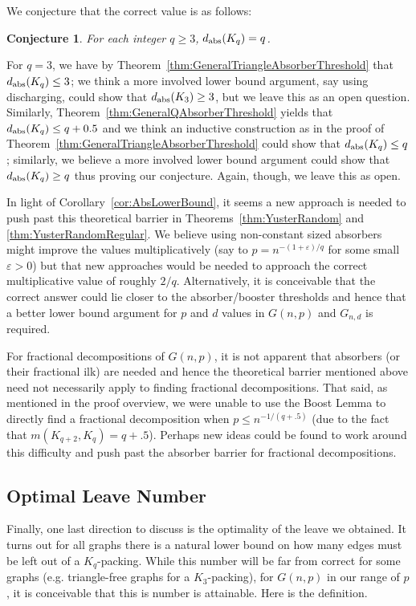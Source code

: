 \documentclass[11pt]{article}
\numberwithin{equation}{section}
\newcounter{i}
\theoremstyle{plain}
\newtheorem{conj}[thm]{Conjecture}
\theoremstyle{plain} %
\theoremstyle{definition}
\begin{document}
We conjecture that the correct value is as follows:

\begin{conj}
For each integer $q\ge 3$, $d_{\rm abs}(K_q)=q$.    
\end{conj} 

For $q=3$, we have by Theorem~\ref{thm:GeneralTriangleAbsorberThreshold} that $d_{\rm abs}(K_q)\le 3$; we think a more involved lower bound argument, say using discharging, could show that $d_{\rm abs}(K_3)\ge 3$, but we leave this as an open question. Similarly, Theorem~\ref{thm:GeneralQAbsorberThreshold} yields that $d_{\rm abs}(K_q)\le q+0.5$ and we think an inductive construction as in the proof of Theorem~\ref{thm:GeneralTriangleAbsorberThreshold} could show that $d_{\rm abs}(K_q)\le q$; similarly, we believe a more involved lower bound argument could show that $d_{\rm abs}(K_q)\ge q$ thus proving our conjecture. Again, though, we leave this as open.

In light of Corollary~\ref{cor:AbsLowerBound}, it seems a new approach is needed to push past this theoretical barrier in Theorems~\ref{thm:YusterRandom} and \ref{thm:YusterRandomRegular}. We believe using non-constant sized absorbers might improve the values multiplicatively (say to $p=n^{-(1+\varepsilon)/q}$ for some small $\varepsilon>0$) but that new approaches would be needed to approach the correct multiplicative value of roughly $2/q$. 
Alternatively, it is conceivable that the correct answer could lie closer to the absorber/booster thresholds and hence that a better lower bound argument for $p$ and $d$ values in $G(n,p)$ and $G_{n,d}$ is required.

For fractional decompositions of $G(n,p)$, it is not apparent that absorbers (or their fractional ilk) are needed and hence the theoretical barrier mentioned above need not necessarily apply to finding fractional decompositions. That said, as mentioned in the proof overview, we were unable to use the Boost Lemma to directly find a fractional decomposition when $p\le n^{-1/(q+.5)}$ (due to the fact that $m(K_{q+2},K_q)=q+.5$). Perhaps new ideas could be found to work around this difficulty and push past the absorber barrier for fractional decompositions. 

\subsection{Optimal Leave Number}

Finally, one last direction to discuss is the optimality of the leave we obtained. It turns out for all graphs there is a natural lower bound on how many edges must be left out of a $K_q$-packing. While this number will be far from correct for some graphs (e.g. triangle-free graphs for a $K_3$-packing), for $G(n,p)$ in our range of $p$, it is conceivable that this is number is attainable. Here is the definition.
\end{document}
